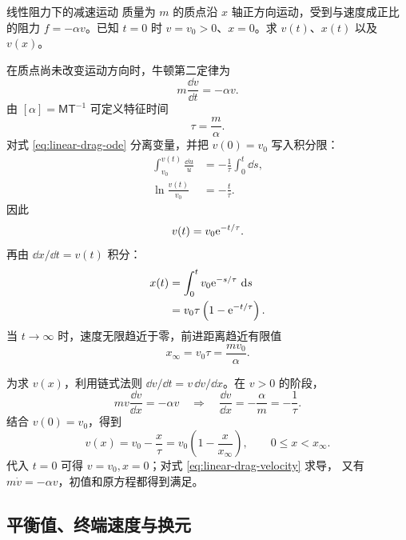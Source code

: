 \documentclass[UTF8,zihao=-4,oneside,openany]{ctexbook}
\begin{document}
\begin{examplebox}{线性阻力下的减速运动}
质量为 $m$ 的质点沿 $x$ 轴正方向运动，受到与速度成正比的阻力
$f=-\alpha v$。已知 $t=0$ 时 $v=v_0>0$、$x=0$。求 $v(t)$、$x(t)$
以及 $v(x)$。

\tcblower
在质点尚未改变运动方向时，牛顿第二定律为
\begin{equation}
  m\frac{\dd v}{\dd t}=-\alpha v.
  \label{eq:linear-drag-ode}
\end{equation}
由 $[\alpha]=\mathsf M\mathsf T^{-1}$ 可定义特征时间
\begin{equation}
  \tau=\frac{m}{\alpha}.
  \label{eq:linear-drag-timescale}
\end{equation}
对式 \eqref{eq:linear-drag-ode} 分离变量，并把 $v(0)=v_0$ 写入积分限：
\begin{align*}
  \int_{v_0}^{v(t)}\frac{\dd u}{u}
  &=-\frac1\tau\int_0^t\dd s,\\
  \ln\frac{v(t)}{v_0}&=-\frac{t}{\tau}.
\end{align*}
因此
\begin{equation}
  v(t)=v_0\mathrm e^{-t/\tau}.
  \label{eq:linear-drag-velocity}
\end{equation}
再由 $\dd x/\dd t=v(t)$ 积分：
\begin{align*}
  x(t)
  &=\int_0^t v_0\mathrm e^{-s/\tau}\,\mathop{}\!\mathrm{d} s\\
  &=v_0\tau\left(1-\mathrm e^{-t/\tau}\right).
\end{align*}
当 $t\to\infty$ 时，速度无限趋近于零，前进距离趋近有限值
\begin{equation}
  x_\infty=v_0\tau=\frac{mv_0}{\alpha}.
  \label{eq:linear-drag-distance}
\end{equation}

为求 $v(x)$，利用链式法则 $\dd v/\dd t=v\,\dd v/\dd x$。在 $v>0$ 的阶段，
\[
  mv\frac{\dd v}{\dd x}=-\alpha v
  \quad\Longrightarrow\quad
  \frac{\dd v}{\dd x}=-\frac{\alpha}{m}=-\frac1\tau.
\]
结合 $v(0)=v_0$，得到
\begin{equation}
  v(x)=v_0-\frac{x}{\tau}
  =v_0\left(1-\frac{x}{x_\infty}\right),
  \qquad 0\le x<x_\infty.
  \label{eq:linear-drag-vx}
\end{equation}
代入 $t=0$ 可得 $v=v_0,x=0$；对式 \eqref{eq:linear-drag-velocity} 求导，
又有 $m\dot v=-\alpha v$，初值和原方程都得到满足。
\end{examplebox}

\subsection{平衡值、终端速度与换元}
\end{document}
